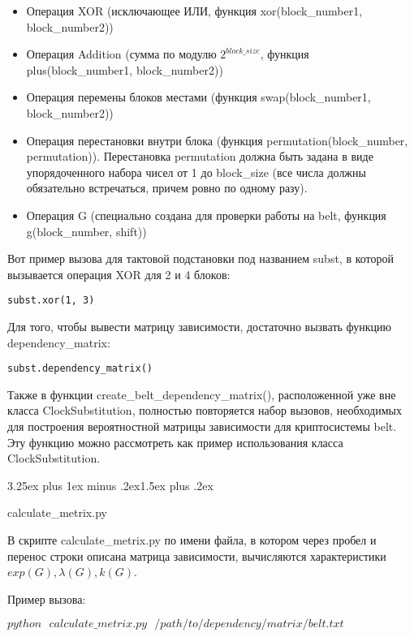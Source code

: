 \documentclass[a4paper,12pt]{report}
\makeatletter
\theoremstyle{plain} %
\theoremstyle{definition}
\theoremstyle{remark}
\renewcommand{\subsection}{\@startsection{subsection}{2}{18pt}%
{3.25ex plus 1ex minus .2ex}{1.5ex plus .2ex}%
{\normalfont\large\bfseries\raggedright}}%
\makeatother
\begin{document}
\begin{large}
\begin{itemize}
\item Операция XOR (исключающее ИЛИ, функция xor(block\_number1, block\_number2))
\item Операция Addition (сумма по модулю $2^{block\_size}$, функция plus(block\_number1, block\_number2))
\item Операция перемены блоков местами (функция swap(block\_number1, block\_number2))
\item Операция перестановки внутри блока (функция permutation(block\_number, permutation)). Перестановка permutation должна быть задана в виде упорядоченного набора чисел от 1 до block\_size (все числа должны обязательно встречаться, причем ровно по одному разу).
\item Операция G (специально создана для проверки работы на belt, функция g(block\_number, shift))
\end{itemize}

Вот пример вызова для тактовой подстановки под названием subst, в которой вызывается операция XOR для 2 и 4 блоков:

\begin{lstlisting}
subst.xor(1, 3)
\end{lstlisting}
Для того, чтобы вывести матрицу зависимости, достаточно вызвать функцию dependency\_matrix:

\begin{lstlisting}
subst.dependency_matrix()
\end{lstlisting}

Также в функции create\_belt\_dependency\_matrix(), расположенной уже вне класса ClockSubstitution, полностью повторяется набор вызовов, необходимых для построения вероятностной матрицы зависимости для криптосистемы belt. Эту функцию можно рассмотреть как пример использования класса ClockSubstitution.

\subsection{calculate\_metrix.py}

В скрипте calculate\_metrix.py по имени файла, в котором через пробел и перенос строки описана матрица зависимости, вычисляются характеристики $exp(G), \lambda(G), k(G)$.

Пример вызова:

$python~~~calculate\_metrix.py~~~/path/to/dependency/matrix/belt.txt$


\end{large}
\end{document}
